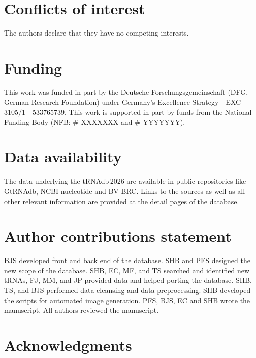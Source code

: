 \documentclass[unnumsec,webpdf,contemporary,large]{oup-authoring-template}
\begin{document}
\section{Conflicts of interest}
The authors declare that they have no competing interests.

\section{Funding}
This work was funded in part by the Deutsche Forschungsgemeinschaft (DFG, German Research Foundation) under Germany's Excellence Strategy - EXC-3105/1 - 533765739,
This work is supported in part by funds from the National Funding Body (NFB: \# XXXXXXX and \# YYYYYYY).

\section{Data availability}
The data underlying the tRNAdb\,2026 are available in public repositories like GtRNAdb, NCBI nucleotide and BV-BRC. Links to the sources as well as all other relevant information are provided at the detail pages of the database.%

\section{Author contributions statement}
BJS developed front and back end of the database. SHB and PFS designed the new scope of the database. SHB, EC, MF, and TS searched and identified new tRNAs, FJ, MM,  and JP provided data and helped porting the database. SHB, TS, and BJS performed data cleansing and data preprocessing. SHB  developed the scripts for automated image generation. PFS, BJS, EC and SHB wrote the manuscript. All authors reviewed the manuscript.

\section{Acknowledgments}




\end{document}

